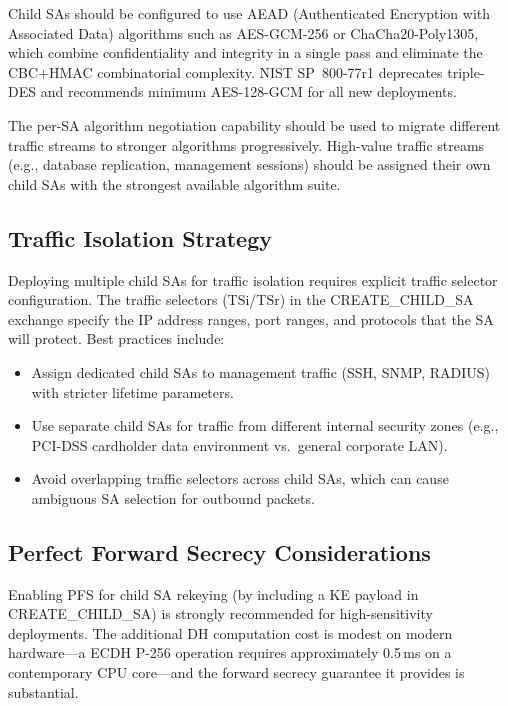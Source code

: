 \documentclass[sigconf,nonacm]{acmart}
\begin{document}
Child SAs should be configured to use AEAD (Authenticated Encryption with Associated
Data) algorithms such as AES-GCM-256 or ChaCha20-Poly1305, which combine
confidentiality and integrity in a single pass and eliminate the CBC+HMAC
combinatorial complexity. NIST SP~800-77r1 deprecates triple-DES and recommends
minimum AES-128-GCM for all new deployments.

The per-SA algorithm negotiation capability should be used to migrate different traffic
streams to stronger algorithms progressively. High-value traffic streams (e.g.,
database replication, management sessions) should be assigned their own child SAs with
the strongest available algorithm suite.

\subsection{Traffic Isolation Strategy}

Deploying multiple child SAs for traffic isolation requires explicit traffic selector
configuration. The traffic selectors (TSi/TSr) in the CREATE\_CHILD\_SA exchange
specify the IP address ranges, port ranges, and protocols that the SA will protect.
Best practices include:

\begin{itemize}
  \item Assign dedicated child SAs to management traffic (SSH, SNMP, RADIUS) with
        stricter lifetime parameters.
  \item Use separate child SAs for traffic from different internal security zones
        (e.g., PCI-DSS cardholder data environment vs.\ general corporate LAN).
  \item Avoid overlapping traffic selectors across child SAs, which can cause
        ambiguous SA selection for outbound packets.
\end{itemize}

\subsection{Perfect Forward Secrecy Considerations}

Enabling PFS for child SA rekeying (by including a KE payload in
CREATE\_CHILD\_SA) is strongly recommended for high-sensitivity deployments. The
additional DH computation cost is modest on modern hardware---a ECDH P-256 operation
requires approximately 0.5\,ms on a contemporary CPU core---and the forward secrecy
guarantee it provides is substantial.
\end{document}
